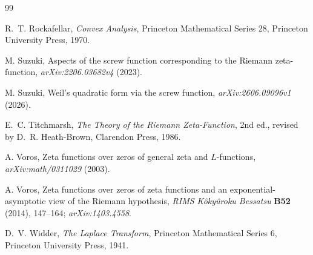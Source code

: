 \documentclass[11pt]{article}
\theoremstyle{remark}
\begin{document}
\begin{thebibliography}{99}

R.~T. Rockafellar,
\emph{Convex Analysis},
Princeton Mathematical Series 28, Princeton University Press, 1970.

M. Suzuki,
Aspects of the screw function corresponding to the Riemann zeta-function,
\emph{arXiv:2206.03682v4} (2023).

M. Suzuki,
Weil's quadratic form via the screw function,
\emph{arXiv:2606.09096v1} (2026).

E.~C. Titchmarsh,
\emph{The Theory of the Riemann Zeta-Function},
2nd ed., revised by D.~R. Heath-Brown, Clarendon Press, 1986.

A. Voros,
Zeta functions over zeros of general zeta and $L$-functions,
\emph{arXiv:math/0311029} (2003).

A. Voros,
Zeta functions over zeros of zeta functions and an exponential-asymptotic view of the Riemann
hypothesis,
\emph{RIMS K\^oky\^uroku Bessatsu} \textbf{B52} (2014), 147--164;
\emph{arXiv:1403.4558}.

D.~V. Widder,
\emph{The Laplace Transform},
Princeton Mathematical Series 6, Princeton University Press, 1941.

\end{thebibliography}
\end{document}
